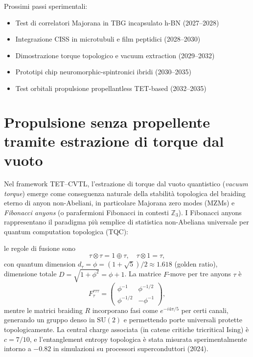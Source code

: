 \documentclass[11pt,a4paper]{article}
\theoremstyle{plain}
\theoremstyle{definition}
\begin{document}
Prossimi passi sperimentali:
\begin{itemize}
    \item Test di correlatori Majorana in TBG incapsulato h-BN (2027--2028)
    \item Integrazione CISS in microtubuli e film peptidici (2028--2030)
    \item Dimostrazione torque topologico e vacuum extraction (2029--2032)
    \item Prototipi chip neuromorphic-spintronici ibridi (2030--2035)
    \item Test orbitali propulsione propellantless TET-based (2032--2035)
\end{itemize}



\vspace{0.4cm}



\section{Propulsione senza propellente tramite estrazione di torque dal vuoto}

Nel framework TET--CVTL, l'estrazione di torque dal vuoto quantistico (\textit{vacuum torque}) emerge come conseguenza naturale della stabilità topologica del braiding eterno di anyon non-Abeliani, in particolare Majorana zero modes (MZMs) e \emph{Fibonacci anyons} (o parafermioni Fibonacci in contesti $\mathbb{Z}_3$). I Fibonacci anyons rappresentano il paradigma più semplice di statistica non-Abeliana universale per quantum computation topologica (TQC):

\vspace{0.4cm}

le regole di fusione sono
\[
\tau \otimes \tau = 1 \oplus \tau, \quad \tau \otimes 1 = \tau,
\]
con quantum dimension $d_\tau = \phi = (1 + \sqrt{5})/2 \approx 1.618$ (golden ratio), dimensione totale $D = \sqrt{1 + \phi^2} = \phi + 1$. La matrice $F$-move per tre anyons $\tau$ è
\[
F^{\tau\tau\tau}_\tau = \begin{pmatrix} \phi^{-1} & \phi^{-1/2} \\ \phi^{-1/2} & -\phi^{-1} \end{pmatrix},
\]
mentre le matrici braiding $R$ incorporano fasi come $e^{-i 4\pi/5}$ per certi canali, generando un gruppo denso in $\mathrm{SU}(2)$ e permettendo porte universali protette topologicamente. La central charge associata (in catene critiche tricritical Ising) è $c = 7/10$, e l'entanglement entropy topologica è stata misurata sperimentalmente intorno a $-0.82$ in simulazioni su processori superconduttori (2024).
\end{document}

